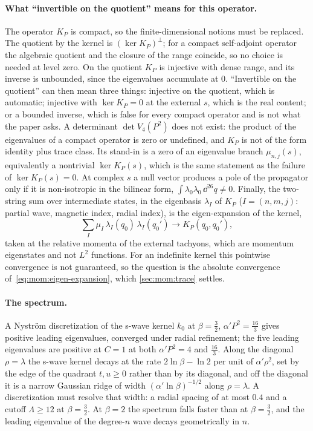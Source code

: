 \paragraph{What ``invertible on the quotient'' means for this operator.}
The operator $K_P$ is compact, so the finite-dimensional notions must be replaced.
The quotient by the kernel is $(\ker K_P)^\perp$; for a compact self-adjoint operator the algebraic quotient and the closure of the range coincide, so no choice is needed at level zero.
On the quotient $K_P$ is injective with dense range, and its inverse is unbounded, since the eigenvalues accumulate at $0$.
``Invertible on the quotient'' can then mean three things: injective on the quotient, which is automatic; injective with $\ker K_P = 0$ at the external $s$, which is the real content; or a bounded inverse, which is false for every compact operator and is not what the paper asks.
A determinant $\det V_4(P^2)$ does not exist: the product of the eigenvalues of a compact operator is zero or undefined, and $K_P$ is not of the form identity plus trace class.
Its stand-in is a zero of an eigenvalue branch $\mu_{n, j}(s)$, equivalently a nontrivial $\ker K_P(s)$, which is the same statement as the failure of $\ker K_P(s) = 0$.
At complex $s$ a null vector produces a pole of the propagator only if it is non-isotropic in the bilinear form, $\int \lambda_0 \lambda_0 \, \dd^{26} q \ne 0$.
Finally, the two-string sum over intermediate states, in the eigenbasis $\lambda_I$ of $K_P$ ($I = (n, m, j)$: partial wave, magnetic index, radial index), is the eigen-expansion of the kernel,
\begin{equation}
  \label{eq:mom:eigen-expansion}
  \sum_I \mu_I \, \lambda_I(q_0) \, \lambda_I(q_0')
    \longrightarrow K_P(q_0, q_0'),
\end{equation}
taken at the relative momenta of the external tachyons, which are momentum eigenstates and not $L^2$ functions.
For an indefinite kernel this pointwise convergence is not guaranteed, so the question is the absolute convergence of~\eqref{eq:mom:eigen-expansion}, which \cref{sec:mom:trace} settles.

\paragraph{The spectrum.}
A Nyström discretization of the s-wave kernel $k_0$ at $\beta = \tfrac{3}{2}$, $\alpha' P^2 = \tfrac{16}{3}$ gives positive leading eigenvalues, converged under radial refinement; the five leading eigenvalues are positive at $C = 1$ at both $\alpha' P^2 = 4$ and $\tfrac{16}{3}$.
Along the diagonal $\rho = \lambda$ the s-wave kernel decays at the rate $2 \ln \beta - \ln 2$ per unit of $\alpha' \rho^2$, set by the edge of the quadrant $t, u \ge 0$ rather than by its diagonal, and off the diagonal it is a narrow Gaussian ridge of width $(\alpha' \ln \beta)^{-1/2}$ along $\rho = \lambda$.
A discretization must resolve that width: a radial spacing of at most $0.4$ and a cutoff $\Lambda \ge 12$ at $\beta = \tfrac{3}{2}$.
At $\beta = 2$ the spectrum falls faster than at $\beta = \tfrac{3}{2}$, and the leading eigenvalue of the degree-$n$ wave decays geometrically in $n$.

